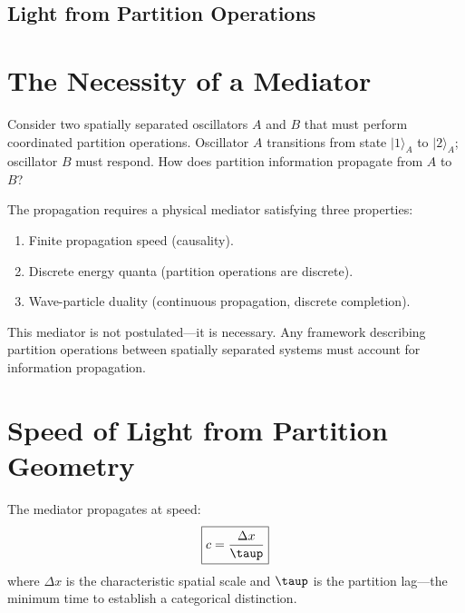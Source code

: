 
\subsection{Light from Partition Operations}
\label{part:light}

\section{The Necessity of a Mediator}
\label{sec:mediator}

Consider two spatially separated oscillators $A$ and $B$ that must perform coordinated partition operations. Oscillator $A$ transitions from state $|1\rangle_A$ to $|2\rangle_A$; oscillator $B$ must respond. How does partition information propagate from $A$ to $B$?

The propagation requires a physical mediator satisfying three properties:
\begin{enumerate}
    \item Finite propagation speed (causality).
    \item Discrete energy quanta (partition operations are discrete).
    \item Wave-particle duality (continuous propagation, discrete completion).
\end{enumerate}

This mediator is not postulated---it is necessary. Any framework describing partition operations between spatially separated systems must account for information propagation.

\section{Speed of Light from Partition Geometry}
\label{sec:speed_of_light}

\begin{theorem}
\label{thm:speed_of_light}
The mediator propagates at speed:
\begin{equation}
\boxed{c = \frac{\Delta x}{\taup}}
\end{equation}
where $\Delta x$ is the characteristic spatial scale and $\taup$ is the partition lag---the minimum time to establish a categorical distinction.
\end{theorem}

